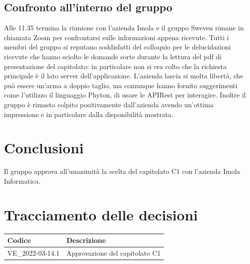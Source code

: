 \documentclass[12pt, a4paper,table]{article}
\begin{document}
		\subsection{Confronto all'interno del gruppo}
		Alle 11.35 termina la riunione con l'azienda Imola e il gruppo Sweven rimane in chiamata Zoom
		per confrontarsi sulle informazioni appena ricevute. \newline
		Tutti i membri del gruppo si reputano soddisfatti del colloquio per le delucidazioni ricevute 
		che hanno sciolto le domande sorte durante la lettura del pdf di presentazione del capitolato:
		in particolare non si era colto che la richiesta principale è il lato server dell'applicazione.
		L'azienda lascia si molta libertà, che può essere un'arma a doppio taglio, ma comunque hanno 
		fornito suggerimenti come l'utilizzo il linguaggio Phyton, di usare le APIRest per interagire.
		Inoltre il gruppo è rimasto colpito positivamente dall'azienda avendo un'ottima impressione e
		in particolare dalla disponibilità mostrata.
	
	\section{Conclusioni}
	Il gruppo approva all'unanimità la scelta del capitolato C1 con l'azienda Imola Informatica.
	\newpage
	
	\section*{Tracciamento delle decisioni}
	\renewcommand{\arraystretch}{2} %
	\begin{tabular}{ |m{8em}|m{30em}| }
		\hline
		\textbf{Codice} & \textbf{Descrizione} \\
		\hline
		VE\_2022-03-14.1 & Approvazione del capitolato C1 \\
		\hline
	\end{tabular}
\end{document}
